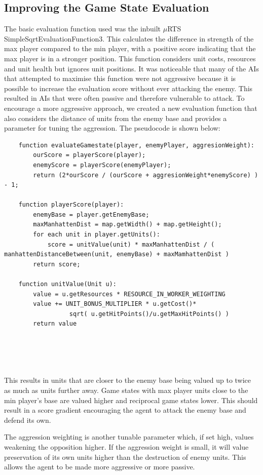 \documentclass[]{article}
\begin{document}
\subsection{Improving the Game State Evaluation}
The basic evaluation function used was the inbuilt $\mu$RTS SimpleSqrtEvaluationFunction3. This calculates the difference in strength of the max player compared to the min player, with a positive score indicating that the max player is in a stronger position. This function considers unit costs, resources and unit health but ignores unit positions. It was noticeable that many of the AIs that attempted to maximise this function were not aggressive because it is possible to increase the evaluation score without ever attacking the enemy. This resulted in AIs that were often passive and therefore vulnerable to attack. To encourage a more aggressive approach, we created a new evaluation function that also considers the distance of units from the enemy base and provides a parameter for tuning the aggression. The pseudocode is shown below:
\begin{lstlisting}
    function evaluateGamestate(player, enemyPlayer, aggresionWeight):
		ourScore = playerScore(player);
		enemyScore = playerScore(enemyPlayer);
		return (2*ourScore / (ourScore + aggresionWeight*enemyScore) ) - 1;

	function playerScore(player):
		enemyBase = player.getEnemyBase;
		maxManhattenDist = map.getWidth() + map.getHeight();
		for each unit in player.getUnits():
			score = unitValue(unit) * maxManhattenDist / ( manhattenDistanceBetween(unit, enemyBase) + maxMamhattenDist ) 
		return score;

	function unitValue(Unit u):
		value = u.getResources * RESOURCE_IN_WORKER_WEIGHTING
		value += UNIT_BONUS_MULTIPLIER * u.getCost()*
		          sqrt( u.getHitPoints()/u.getMaxHitPoints() )
		return value
		

	
	
\end{lstlisting}

This results in units that are closer to the enemy base being valued up to twice as much as units further away. Game states with max player units close to the min player’s base are valued higher and reciprocal game states lower. This should result in a score gradient encouraging the agent to attack the enemy base and defend its own. 

The aggression weighting is another tunable parameter which, if set high, values weakening the opposition higher. If the aggression weight is small, it will value preservation of its own units higher than the destruction of enemy units. This allows the agent to be made more aggressive or more passive. 
\end{document}
